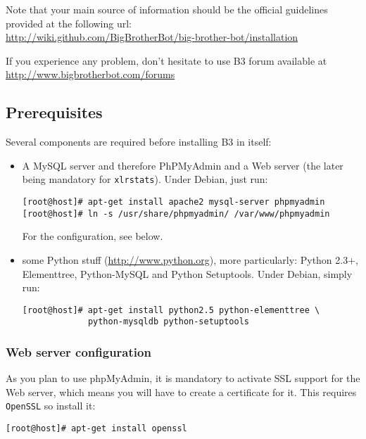 Note that your main source of information should be the official guidelines
provided at the following url:\\ 
\url{http://wiki.github.com/BigBrotherBot/big-brother-bot/installation}

If you experience any problem, don't hesitate to use B3 forum available at 
\url{http://www.bigbrotherbot.com/forums} 

\subsection{Prerequisites}
\label{sec:b3:prerequisite}

Several components are required before installing B3 in itself: 
\begin{itemize}
\item A MySQL server and therefore PhPMyAdmin and a Web server (the later being
  mandatory for \texttt{xlrstats}).
  Under Debian, just run: 
  \begin{lstlisting}[style=command]
[root@host]# apt-get install apache2 mysql-server phpmyadmin
[root@host]# ln -s /usr/share/phpmyadmin/ /var/www/phpmyadmin
  \end{lstlisting}
  For the configuration, see below. 
\item some Python stuff (\url{http://www.python.org}), more particularly: 
  Python 2.3+, Elementtree, Python-MySQL and Python Setuptools. Under Debian,
  simply run: 
  \begin{lstlisting}[style=command]
[root@host]# apt-get install python2.5 python-elementtree \ 
             python-mysqldb python-setuptools
  \end{lstlisting}
\end{itemize}

\subsubsection{Web server configuration}
\label{sub:b3:apache}

As you plan to use phpMyAdmin, it is mandatory to activate SSL support for the
Web server, which means you will have to create a certificate for it.
This requires \texttt{OpenSSL} so install it: 
  \begin{lstlisting}[style=command]
[root@host]# apt-get install openssl
  \end{lstlisting}

